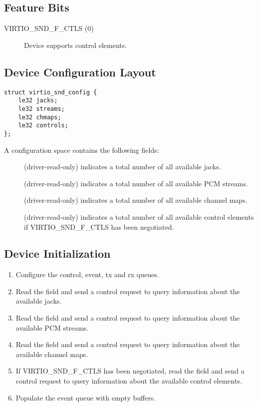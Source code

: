 \subsection{Feature Bits}\label{sec:Device Types / Sound Device / Feature Bits}

\begin{description}
\item[VIRTIO_SND_F_CTLS (0)]
Device supports control elements.
\end{description}

\subsection{Device Configuration Layout}\label{sec:Device Types / Sound Device / Device Configuration Layout}

\begin{lstlisting}
struct virtio_snd_config {
    le32 jacks;
    le32 streams;
    le32 chmaps;
    le32 controls;
};
\end{lstlisting}

A configuration space contains the following fields:

\begin{description}
\item[] (driver-read-only) indicates a total number of all available
jacks.
\item[] (driver-read-only) indicates a total number of all available
PCM streams.
\item[] (driver-read-only) indicates a total number of all available
channel maps.
\item[] (driver-read-only) indicates a total number of all available
control elements if VIRTIO_SND_F_CTLS has been negotiated.

\end{description}

\subsection{Device Initialization}

\begin{enumerate}
\item Configure the control, event, tx and rx queues.
\item Read the  field and send a control request to query information
about the available jacks.
\item Read the  field and send a control request to query information
about the available PCM streams.
\item Read the  field and send a control request to query information
about the available channel maps.
\item If VIRTIO_SND_F_CTLS has been negotiated, read the  field
and send a control request to query information about the available control elements.
\item Populate the event queue with empty buffers.
\end{enumerate}

